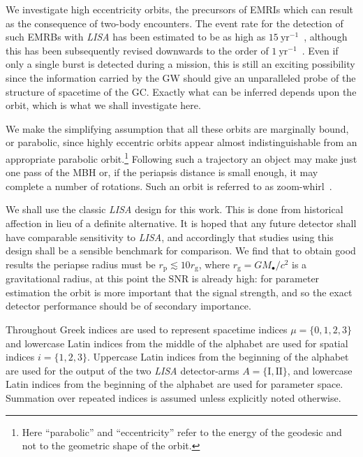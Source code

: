 \documentclass[11pt,twoside]{article}
\begin{document}
We investigate high eccentricity orbits, the precursors of EMRIs which can result as the consequence of two-body encounters. The event rate for the detection of such EMRBs with \textit{LISA} has been estimated to be as high as $15~\mathrm{yr^{-1}}$~\citep*{Rubbo2006}, although this has been subsequently revised downwards to the order of $1~\mathrm{yr^{-1}}$~\citep*{Hopman2007}. Even if only a single burst is detected during a mission, this is still an exciting possibility since the information carried by the GW should give an unparalleled probe of the structure of spacetime of the GC. Exactly what can be inferred depends upon the orbit, which is what we shall investigate here. 

We make the simplifying assumption that all these orbits are marginally bound, or parabolic, since highly eccentric orbits appear almost indistinguishable from an appropriate parabolic orbit.\footnote{Here ``parabolic'' and ``eccentricity'' refer to the energy of the geodesic and not to the geometric shape of the orbit.} Following such a trajectory an object may make just one pass of the MBH or, if the periapsis distance is small enough, it may complete a number of rotations. Such an orbit is referred to as zoom-whirl~\citep{Glampedakis2002a}.

We shall use the classic \textit{LISA} design for this work. This is done from historical affection in lieu of a definite alternative. It is hoped that any future detector shall have comparable sensitivity to \textit{LISA}, and accordingly that studies using this design shall be a sensible benchmark for comparison. We find that to obtain good results the periapse radius must be $r_\mathrm{p} \lesssim 10 r_\mathrm{g}$, where $r_\mathrm{g} = GM_\bullet / c^2$ is a gravitational radius, at this point the SNR is already high: for parameter estimation the orbit is more important that the signal strength, and so the exact detector performance should be of secondary importance.

Throughout Greek indices are used to represent spacetime indices $\mu = \{0,1,2,3\}$ and lowercase Latin indices from the middle of the alphabet are used for spatial indices $i = \{1,2,3\}$. Uppercase Latin indices from the beginning of the alphabet are used for the output of the two \textit{LISA} detector-arms $A = \{\mathrm{I}, \mathrm{II}\}$, and lowercase Latin indices from the beginning of the alphabet are used for parameter space. Summation over repeated indices is assumed unless explicitly noted otherwise.
\end{document}
